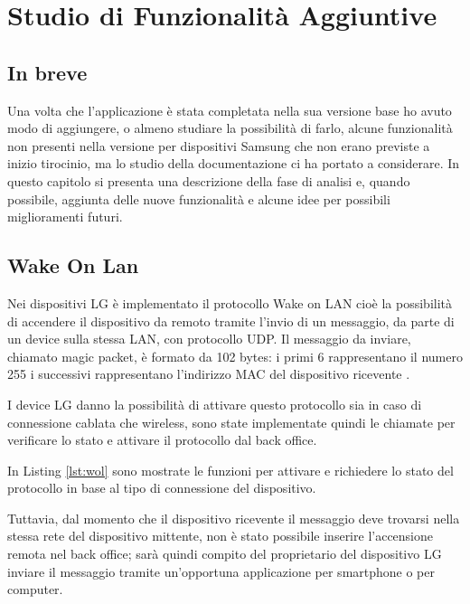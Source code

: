 \chapter{Studio di Funzionalità Aggiuntive}\label{aggiunte}

\section{In breve}
Una volta che l'applicazione è stata completata nella sua versione base ho avuto modo di aggiungere, o almeno studiare la possibilità di farlo, alcune funzionalità non presenti nella versione per dispositivi Samsung che non erano previste a inizio tirocinio, ma lo studio della documentazione ci ha portato a considerare.
In questo capitolo si presenta una descrizione della fase di analisi e, quando possibile, aggiunta delle nuove funzionalità e alcune idee per possibili miglioramenti futuri.

\section{Wake On Lan}

Nei dispositivi LG è implementato il protocollo Wake on LAN cioè la possibilità di accendere il dispositivo da remoto tramite l'invio di un messaggio, da parte di un device sulla stessa LAN, con protocollo UDP.
Il messaggio da inviare, chiamato magic packet, è formato da 102 bytes: i primi 6 rappresentano il numero 255 i successivi rappresentano l'indirizzo MAC del dispositivo ricevente \cite{wol}.

I device LG danno la possibilità di attivare questo protocollo sia in caso di connessione cablata che wireless, sono state implementate quindi le chiamate per verificare lo stato e attivare il protocollo dal back office.

In Listing \ref*{lst:wol} sono mostrate le funzioni per attivare e richiedere lo stato del protocollo in base al tipo di connessione del dispositivo.



Tuttavia, dal momento che il dispositivo ricevente il messaggio deve trovarsi nella stessa rete del dispositivo mittente, non è stato possibile inserire l'accensione remota nel back office; sarà quindi compito del proprietario del dispositivo LG inviare il messaggio tramite un'opportuna applicazione per smartphone o per computer.

